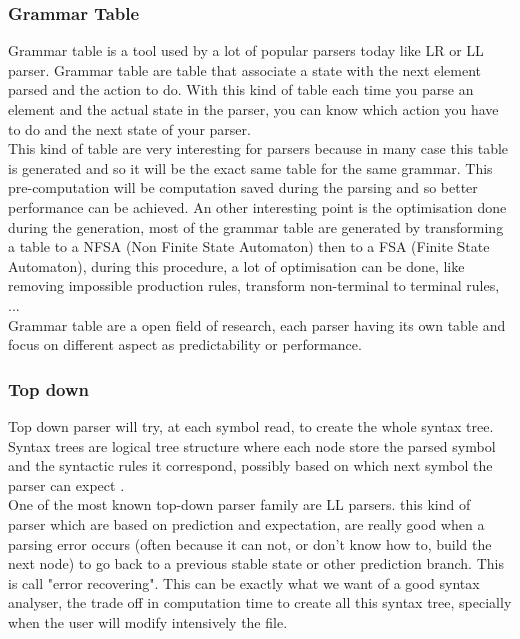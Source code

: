 \subsubsection{Grammar Table}
Grammar table is a tool used by a lot of popular parsers today like LR or LL parser. Grammar table are table that associate a state with the next element parsed and the action to do. With this kind of table each time you parse an element and the actual state in the parser, you can know which action you have to do and the next state of your parser.\\
This kind of table are very interesting for parsers because in many case this table is generated and so it will be the exact same table for the same grammar. This pre-computation will be computation saved during the parsing and so better performance can be achieved. An other interesting point is the optimisation done during the generation, most of the grammar table are generated by transforming a table to a NFSA (Non Finite State Automaton) then to a FSA (Finite State Automaton), during this procedure, a lot of optimisation can be done, like removing impossible production rules, transform non-terminal to terminal rules, ...\\
Grammar table are a open field of research, each parser having its own table and focus on different aspect as predictability or performance.

\subsubsection{Top down}
Top down parser will try, at each symbol read, to create the whole syntax tree. Syntax trees are logical tree structure where each node store the parsed symbol and the syntactic rules it correspond, possibly based on which next symbol the parser can expect \cite{knuth1971top}\cite{grune2008parsing}. 
\\One of the most known top-down parser family are LL parsers. this kind of parser which are based on prediction and expectation, are really good when a parsing error occurs (often because it can not, or don't know how to, build the next node) to go back to a previous stable state or other prediction branch. This is call "error recovering"\cite{panopticoncentral_2009}. This can be exactly what we want of a good syntax analyser, the trade off in computation time to create all this syntax tree, specially when the user will modify intensively the file.

